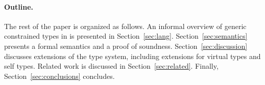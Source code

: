 \paragraph{Outline.}

The rest of the paper is organized as follows.
%
An informal overview of generic constrained types in \Xten{}
is presented in
Section~\ref{sec:lang}.
%
%
Section~\ref{sec:semantics} presents a formal semantics and a
proof of soundness.
%
Section~\ref{sec:discussion} discusses extensions of the type system,
including extensions for virtual types and self types.
%
Related work is discussed in Section~\ref{sec:related}.
%
Finally, Section~\ref{sec:conclusions} concludes.


